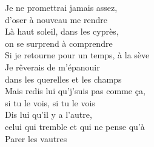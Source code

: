 Je ne promettrai jamais assez, \\
d'oser à nouveau me rendre \\
Là haut soleil, dans les cyprès, \\
on se surprend à comprendre \\
Si je retourne pour un temps, à la sève \\
Je rêverais de m'épanouir \\
dans les querelles et les champs \\
Mais redis lui qu'j'suis pas comme ça, \\
si tu le vois, si tu le vois \\
Dis lui qu'il y a l'autre, \\
celui qui tremble et qui ne pense qu'à \\
Parer les vautres \\